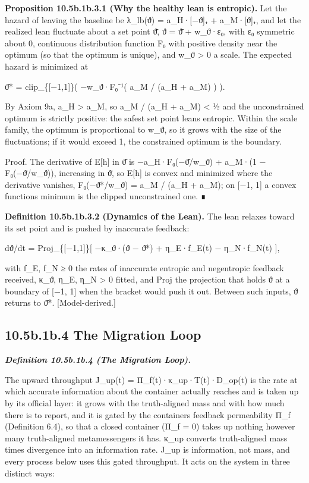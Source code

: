 \documentclass[
]{article}
\begin{document}
\textbf{Proposition 10.5b.1b.3.1 (Why the healthy lean is entropic).}
Let the hazard of leaving the baseline be λ\_lb(ϑ) = a\_H·{[}−ϑ{]}₊ +
a\_M·{[}ϑ{]}₊, and let the realized lean fluctuate about a set point ϑ̄,
ϑ = ϑ̄ + w\_ϑ·ε₀, with ε₀ symmetric about 0, continuous distribution
function F₀ with positive density near the optimum (so that the optimum
is unique), and w\_ϑ \textgreater{} 0 a scale. The expected hazard is
minimized at

ϑ̄* = clip\_\{{[}−1,1{]}\}( −w\_ϑ·F₀⁻¹( a\_M / (a\_H + a\_M) ) ).

By Axiom 9a, a\_H \textgreater{} a\_M, so a\_M / (a\_H + a\_M)
\textless{} ½ and the unconstrained optimum is strictly positive: the
safest set point leans entropic. Within the scale family, the optimum is
proportional to w\_ϑ, so it grows with the size of the fluctuations; if
it would exceed 1, the constrained optimum is the boundary.

Proof. The derivative of E{[}h{]} in ϑ̄ is −a\_H·F₀(−ϑ̄/w\_ϑ) + a\_M·(1 −
F₀(−ϑ̄/w\_ϑ)), increasing in ϑ̄, so E{[}h{]} is convex and minimized where
the derivative vanishes, F₀(−ϑ̄*/w\_ϑ) = a\_M / (a\_H + a\_M); on {[}−1,
1{]} a convex function\textquotesingle s minimum is the clipped
unconstrained one. ∎

\textbf{Definition 10.5b.1b.3.2 (Dynamics of the Lean).} The lean
relaxes toward its set point and is pushed by inaccurate feedback:

dϑ/dt = Proj\_\{{[}−1,1{]}\}{[} −κ\_ϑ·(ϑ − ϑ̄*) + η\_E·f\_E(t) −
η\_N·f\_N(t) {]},

with f\_E, f\_N ≥ 0 the rates of inaccurate entropic and negentropic
feedback received, κ\_ϑ, η\_E, η\_N \textgreater{} 0 fitted, and Proj
the projection that holds ϑ at a boundary of {[}−1, 1{]} when the
bracket would push it out. Between such inputs, ϑ returns to ϑ̄*.
{[}Model-derived.{]}

\hypertarget{b.1b.4-the-migration-loop}{%
\subsection{10.5b.1b.4 The Migration
Loop}\label{b.1b.4-the-migration-loop}}

\emph{\textbf{Definition 10.5b.1b.4 (The Migration Loop).}}

The upward throughput J\_up(t) = Π\_f(t)·κ\_up·T(t)·D\_op(t) is the rate
at which accurate information about the container actually reaches and
is taken up by its official layer: it grows with the truth-aligned mass
and with how much there is to report, and it is gated by the
container\textquotesingle s feedback permeability Π\_f (Definition 6.4),
so that a closed container (Π\_f = 0) takes up nothing however many
truth-aligned metamessengers it has. κ\_up converts truth-aligned mass
times divergence into an information rate. J\_up is information, not
mass, and every process below uses this gated throughput. It acts on the
system in three distinct ways:
\end{document}
